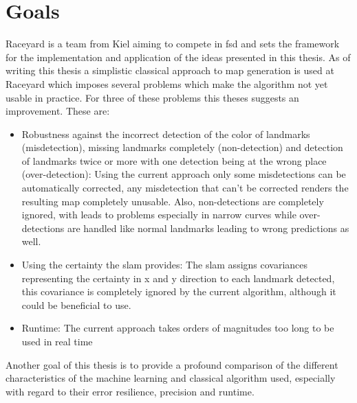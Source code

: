 


\section{Goals}
Raceyard is a team from Kiel aiming to compete in \ac{fsd} and sets the framework for the implementation and application of the ideas presented in this thesis. As of writing this thesis a simplistic classical approach to map generation is used at Raceyard which imposes several problems which make the algorithm not yet usable in practice. For three of these problems this theses suggests an improvement. These are:

\begin{itemize}
    \item Robustness against the incorrect detection of the color of landmarks (misdetection), missing landmarks completely (non-detection) and detection of landmarks twice or more with one detection being at the wrong place (over-detection): Using the current approach only some misdetections can be automatically corrected, any misdetection that can't be corrected renders the resulting map completely unusable. Also, non-detections are completely ignored, with leads to problems especially in narrow curves while over-detections are handled like normal landmarks leading to wrong predictions as well.
    \item Using the certainty the \ac{slam} provides: The \ac{slam} assigns covariances representing the certainty in x and y direction to each landmark detected, this covariance is completely ignored by the current algorithm, although it could be beneficial to use.
    \item Runtime: The current approach takes orders of magnitudes too long to be used in real time
\end{itemize}

Another goal of this thesis is to provide a profound comparison of the different characteristics of the machine learning and classical algorithm used, especially with regard to their error resilience, precision and runtime.

